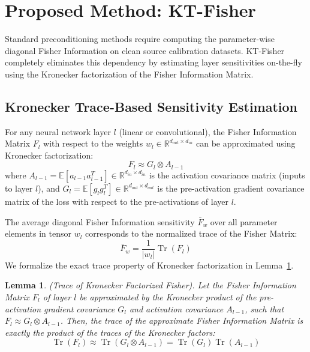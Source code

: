 \documentclass{article}
\theoremstyle{plain}
\newtheorem{lemma}[theorem]{Lemma}
\theoremstyle{definition}
\theoremstyle{remark}
\begin{document}
\section{Proposed Method: KT-Fisher}
\label{proposed-method}
Standard preconditioning methods require computing the parameter-wise diagonal Fisher Information on clean source calibration datasets. KT-Fisher completely eliminates this dependency by estimating layer sensitivities on-the-fly using the Kronecker factorization of the Fisher Information Matrix.

\subsection{Kronecker Trace-Based Sensitivity Estimation}
For any neural network layer $l$ (linear or convolutional), the Fisher Information Matrix $F_l$ with respect to the weights $w_l \in \mathbb{R}^{d_{out} \times d_{in}}$ can be approximated using Kronecker factorization:
\begin{equation}
    F_l \approx G_l \otimes A_{l-1}
\end{equation}
where $A_{l-1} = \mathbb{E}[a_{l-1} a_{l-1}^T] \in \mathbb{R}^{d_{in} \times d_{in}}$ is the activation covariance matrix (inputs to layer $l$), and $G_l = \mathbb{E}[g_l g_l^T] \in \mathbb{R}^{d_{out} \times d_{out}}$ is the pre-activation gradient covariance matrix of the loss with respect to the pre-activations of layer $l$.

The average diagonal Fisher Information sensitivity $\bar{F}_w$ over all parameter elements in tensor $w_l$ corresponds to the normalized trace of the Fisher Matrix:
\begin{equation}
    \bar{F}_w = \frac{1}{|w_l|} \operatorname{Tr}(F_l)
\end{equation}
We formalize the exact trace property of Kronecker factorization in Lemma~\ref{lemma:trace_kron}.

\begin{lemma} (Trace of Kronecker Factorized Fisher). \label{lemma:trace_kron} Let the Fisher Information Matrix $F_l$ of layer $l$ be approximated by the Kronecker product of the pre-activation gradient covariance $G_l$ and activation covariance $A_{l-1}$, such that $F_l \approx G_l \otimes A_{l-1}$. Then, the trace of the approximate Fisher Information Matrix is exactly the product of the traces of the Kronecker factors:
\begin{equation}
    \operatorname{Tr}(F_l) \approx \operatorname{Tr}(G_l \otimes A_{l-1}) = \operatorname{Tr}(G_l) \operatorname{Tr}(A_{l-1})
\end{equation}
\end{lemma}
\end{document}

